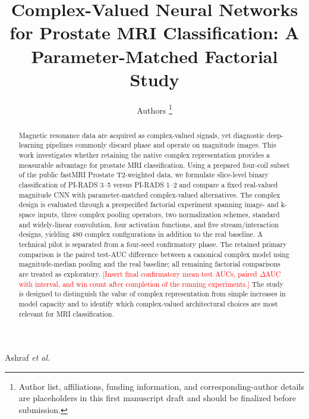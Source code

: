 \documentclass[journal]{IEEEtran}
\begin{document}
\title{Complex-Valued Neural Networks for Prostate MRI Classification: A Parameter-Matched Factorial Study}

\author{Authors%
\thanks{Author list, affiliations, funding information, and corresponding-author details are placeholders in this first manuscript draft and should be finalized before submission.}}

%
{Ashraf \MakeLowercase{\emph{et al.}}}

\maketitle

\newcommand{\rev}[1]{\textcolor{red}{#1}}
\newcommand{\placeholderfig}[2]{%
\begin{figure}[t]
    \centering
    \fbox{\parbox[c][4.0cm][c]{0.91\linewidth}{\centering\small #1}}
    \caption{\small #2}
\end{figure}}

\begin{abstract}
Magnetic resonance data are acquired as complex-valued signals, yet diagnostic deep-learning pipelines commonly discard phase and operate on magnitude images. This work investigates whether retaining the native complex representation provides a measurable advantage for prostate MRI classification. Using a prepared four-coil subset of the public fastMRI Prostate T2-weighted data, we formulate slice-level binary classification of PI-RADS 3--5 versus PI-RADS 1--2 and compare a fixed real-valued magnitude CNN with parameter-matched complex-valued alternatives. The complex design is evaluated through a prespecified factorial experiment spanning image- and k-space inputs, three complex pooling operators, two normalization schemes, standard and widely-linear convolution, four activation functions, and five stream/interaction designs, yielding 480 complex configurations in addition to the real baseline. A technical pilot is separated from a four-seed confirmatory phase. The retained primary comparison is the paired test-AUC difference between a canonical complex model using magnitude-median pooling and the real baseline; all remaining factorial comparisons are treated as exploratory. \rev{[Insert final confirmatory mean test AUCs, paired $\Delta$AUC with interval, and win count after completion of the running experiments.] } The study is designed to distinguish the value of complex representation from simple increases in model capacity and to identify which complex-valued architectural choices are most relevant for MRI classification.
\end{abstract}
\end{document}
